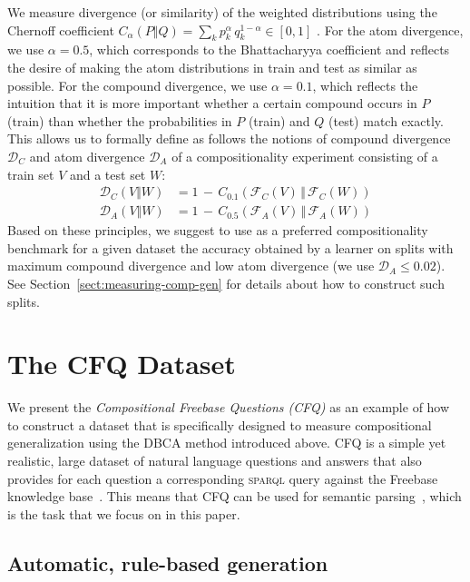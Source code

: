 \documentclass[letterpaper]{article}
\newcommand{\SPARQL}{\textsc{sparql}}
\begin{document}
We measure divergence (or similarity) of the weighted distributions using the Chernoff coefficient $C_\alpha(P \Vert Q) = \sum_{k} p_k^\alpha \, q_k^{1-\alpha} \in [0, 1]$ \citep{chung1989measures}.
For the atom divergence, we use $\alpha=0.5$, which corresponds to the Bhattacharyya coefficient and reflects the desire of making the atom distributions in train and test as similar as possible.
For the compound divergence, we use $\alpha = 0.1$, which reflects the intuition that it is more important whether a certain compound occurs in $P$ (train) than whether the probabilities in $P$ (train) and $Q$ (test) match exactly.
This allows us to formally define as follows the notions of compound divergence $\mathcal{D}_C$ and atom divergence $\mathcal{D}_A$ of a compositionality experiment consisting of a train set $V$ and a test set $W$:
\begin{align*}
    \mathcal{D}_C(V \Vert W) &= 1\,-\, C_{0.1}(\mathcal{F}_C(V) \, \Vert \, \mathcal{F}_C(W)) \\
    \mathcal{D}_A(V \Vert W) &= 1\,-\, C_{0.5}(\mathcal{F}_A(V) \, \Vert \, \mathcal{F}_A(W))
\end{align*}
Based on these principles, we suggest to use as a preferred compositionality benchmark for a given dataset the accuracy obtained by a learner on splits with maximum compound divergence and low atom divergence (we use $\mathcal{D}_A \leq 0.02$). See Section~\ref{sect:measuring-comp-gen} for details about how to construct such splits.



\section{The CFQ Dataset}
\label{sect:cfq}

We present the {\em Compositional Freebase Questions (CFQ)} as an example of how to construct a dataset that is specifically designed to measure compositional generalization using the DBCA method introduced above. CFQ is a simple yet realistic, large dataset of natural language questions and answers that also provides for each question a corresponding \SPARQL{} query against the Freebase knowledge base~\citep{bollacker2008freebase}. This means that CFQ can be used for semantic parsing~\citep{berant2013semantic,yao2014information}, which is the task that we focus on in this paper.

\subsection{Automatic, rule-based generation}
\label{sect:rule-based-generation}
\end{document}
